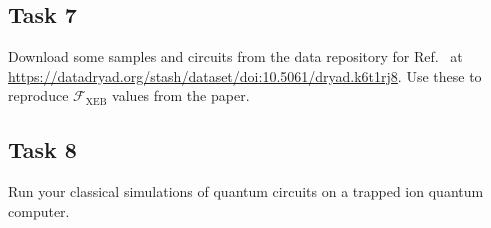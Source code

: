\documentclass[12pt]{article}
\begin{document}
\subsection*{Task 7}

Download some samples and circuits from the data repository for Ref.~ at \url{https://datadryad.org/stash/dataset/doi:10.5061/dryad.k6t1rj8}.
Use these to reproduce $\mathcal{F}_\mathrm{XEB}$ values from the paper.


\subsection*{Task 8}

Run your classical simulations of quantum circuits on a trapped ion quantum computer.


\printbibliography
\end{document}
